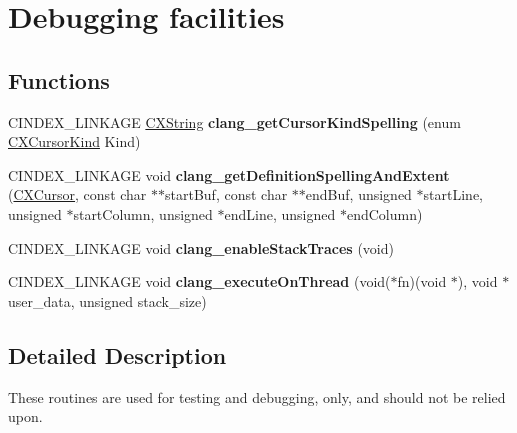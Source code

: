\hypertarget{group__CINDEX__DEBUG}{}\section{Debugging facilities}
\label{group__CINDEX__DEBUG}
\subsection*{Functions}
\begin{DoxyCompactItemize}
\item 
\mbox{\label{group__CINDEX__DEBUG_ga7a4eecfc1b343568cb9ea447cbde08a8}} 
C\+I\+N\+D\+E\+X\+\_\+\+L\+I\+N\+K\+A\+GE \mbox{\hyperlink{structCXString}{C\+X\+String}} {\bfseries clang\+\_\+get\+Cursor\+Kind\+Spelling} (enum \mbox{\hyperlink{group__CINDEX_gaaccc432245b4cd9f2d470913f9ef0013}{C\+X\+Cursor\+Kind}} Kind)
\item 
\mbox{\label{group__CINDEX__DEBUG_ga707dccd8978d58267923359b5b9a0701}} 
C\+I\+N\+D\+E\+X\+\_\+\+L\+I\+N\+K\+A\+GE void {\bfseries clang\+\_\+get\+Definition\+Spelling\+And\+Extent} (\mbox{\hyperlink{structCXCursor}{C\+X\+Cursor}}, const char $\ast$$\ast$start\+Buf, const char $\ast$$\ast$end\+Buf, unsigned $\ast$start\+Line, unsigned $\ast$start\+Column, unsigned $\ast$end\+Line, unsigned $\ast$end\+Column)
\item 
\mbox{\label{group__CINDEX__DEBUG_ga66eec2931642afdf8b13a81447d5022d}} 
C\+I\+N\+D\+E\+X\+\_\+\+L\+I\+N\+K\+A\+GE void {\bfseries clang\+\_\+enable\+Stack\+Traces} (void)
\item 
\mbox{\label{group__CINDEX__DEBUG_ga80c2e471ea922c1bfda2bdd3438c7cdc}} 
C\+I\+N\+D\+E\+X\+\_\+\+L\+I\+N\+K\+A\+GE void {\bfseries clang\+\_\+execute\+On\+Thread} (void($\ast$fn)(void $\ast$), void $\ast$user\+\_\+data, unsigned stack\+\_\+size)
\end{DoxyCompactItemize}


\subsection{Detailed Description}
These routines are used for testing and debugging, only, and should not be relied upon. 